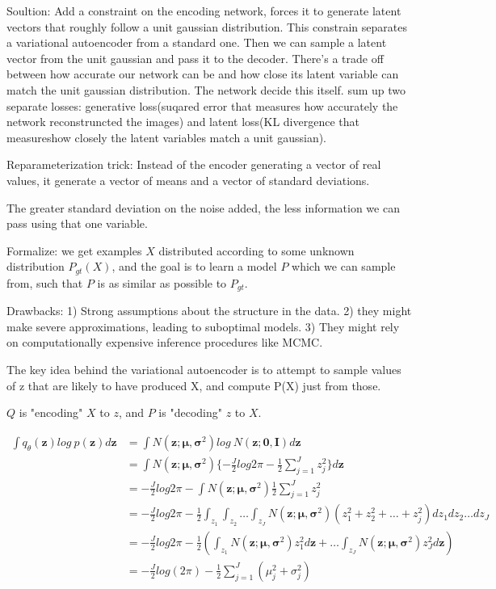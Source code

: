 \documentclass{article}
\begin{document}
Soultion: Add a constraint on the encoding network, forces it to generate latent vectors that roughly follow a unit gaussian distribution. This constrain separates a variational autoencoder from a standard one. Then we can sample a latent vector from the unit gaussian and pass it to the decoder. There's a trade off between how accurate our network can be and how close its latent variable can match the unit gaussian distribution. The network decide this itself. sum up two separate losses: generative loss(suqared error that measures how accurately the network reconstruncted the images) and latent loss(KL divergence that measureshow closely the latent variables match a unit gaussian).


Reparameterization trick: Instead of the encoder generating a vector of real values, it generate a vector of means and a vector of standard deviations.


The greater standard deviation on the noise added, the less information we can pass using that one variable.


Formalize: we get examples $X$ distributed according to some unknown distribution $P_{gt}(X)$, and the goal is to learn a model $P$ which we can sample from, such that $P$ is as similar as possible to $P_{gt}$.

Drawbacks: 1) Strong assumptions about the structure in the data. 2) they might make severe approximations, leading to suboptimal models. 3) They might rely on computationally expensive inference procedures like MCMC.


The key idea behind the variational autoencoder is to attempt to sample values of z that are likely to have produced X, and compute P(X) just from those.

$Q$ is "encoding" $X$ to $z$, and $P$ is "decoding" $z$ to $X$.




\begin{equation}
\begin{split}
\int q_\theta(\boldsymbol{z})log\ p(\boldsymbol{z})d\boldsymbol{z} &= \int N(\boldsymbol{z};\boldsymbol{\mu}, \boldsymbol{\sigma}^2)log\ N(\boldsymbol{z};\boldsymbol{0},\boldsymbol{I})d\boldsymbol{z}\\
&=\int N(\boldsymbol{z};\boldsymbol{\mu}, \boldsymbol{\sigma}^2)\{-\frac{J}{2}log 2\pi -\frac{1}{2} \sum_{j=1}^J z_j^2\}d\boldsymbol{z}\\
&=-\frac{J}{2}log 2\pi -\int N(\boldsymbol{z};\boldsymbol{\mu}, \boldsymbol{\sigma}^2)\frac{1}{2} \sum_{j=1}^J z_j^2\\
&=-\frac{J}{2}log 2\pi -\frac{1}{2}\int_{z_1} \int_{z_2}\dots\int_{z_J} N(\boldsymbol{z};\boldsymbol{\mu}, \boldsymbol{\sigma}^2) (z_1^2+z_2^2+\dots+z_j^2)dz_1dz_2\dots dz_J\\
&=-\frac{J}{2}log 2\pi -\frac{1}{2}(\int_{z_1} N(\boldsymbol{z};\boldsymbol{\mu}, \boldsymbol{\sigma}^2) z_1^2d\boldsymbol{z}+\dots \int_{z_J} N(\boldsymbol{z};\boldsymbol{\mu}, \boldsymbol{\sigma}^2) z_J^2d\boldsymbol{z})\\
&=-\frac{J}{2} log(2\pi)-\frac{1}{2}\sum^J_{j=1}(\mu_j^2+\sigma_j^2)
\end{split}
\end{equation}
\end{document}
